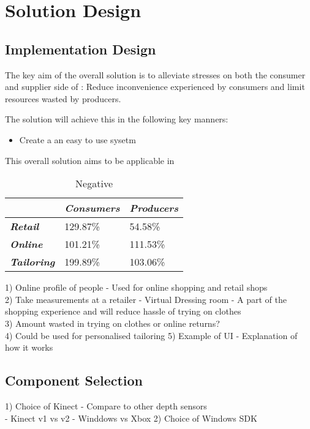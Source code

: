 \chapter{Solution Design}

\section{Implementation Design}


The key aim of the overall solution is to alleviate stresses on both the consumer and supplier side of : Reduce inconvenience experienced by consumers and limit resources wasted by producers.

The solution will achieve this in the following key manners:
\begin{itemize}
	\item Create a an easy to use sysetm
\end{itemize} 

This overall solution aims to be applicable in 



\begin{table}[htbp]
	\centering
	\caption{Negative}
	\begin{tabularx}{\textwidth}{|Y|Y|Y|}
		\toprule
		& 
		\textit{\textbf{Consumers}} & 
		\textit{\textbf{Producers}} \\
		\midrule
		\textit{\textbf{Retail}} & 
		129.87\% & 
		54.58\% \\
		\midrule
		\textit{\textbf{Online}} & 
		101.21\% & 
		111.53\% \\
		\midrule
		\textit{\textbf{Tailoring}} & 
		199.89\% & 
		103.06\% \\
		\bottomrule
	\end{tabularx}%
	\label{tab:consumerProducerHassles}%
\end{table}%

1) Online profile of people - Used for online shopping and retail shops\\
2) Take measurements at a retailer - Virtual Dressing room - A part of the shopping experience and will reduce hassle of trying on clothes\\
3) Amount wasted in trying on clothes or online returns?\\
4) Could be used for personalised tailoring
5) Example of UI - Explanation of how it works

\section{Component Selection}
1) Choice of Kinect - Compare to other depth sensors\\
- Kinect v1 vs v2
- Winddows vs Xbox
2) Choice of Windows SDK\\

